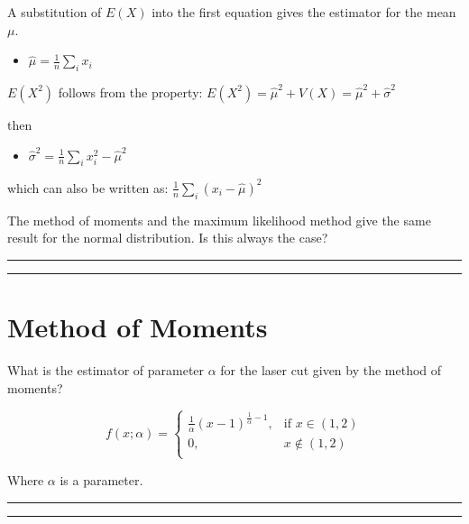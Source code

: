 \documentclass[
]{book}
\providecommand{\tightlist}{%
  \setlength{\itemsep}{0pt}\setlength{\parskip}{0pt}}
\begin{document}
A substitution of \(E(X)\) into the first equation gives the estimator for the mean \(\mu\).

\begin{itemize}
\tightlist
\item
  \(\hat{\mu}=\frac{1}{n}\sum_i x_i\)
\end{itemize}

\(E(X^2)\) follows from the property: \(E(X^2) = \hat{\mu}^2 + V(X)= \hat{\mu}^2+\hat{\sigma}^2\)

then

\begin{itemize}
\tightlist
\item
  \(\hat{\sigma}^2= \frac{1}{n} \sum_i x^2_i -\hat{\mu}^2\)
\end{itemize}

which can also be written as:
\(\frac{1}{n} \sum_i(x_i-\hat{\mu})^2\)

The method of moments and the maximum likelihood method give the same result for the normal distribution. Is this always the case?

\begin{center}\rule{0.5\linewidth}{0.5pt}\end{center}

\begin{center}\rule{0.5\linewidth}{0.5pt}\end{center}

\hypertarget{method-of-moments-7}{%
\section{Method of Moments}\label{method-of-moments-7}}

What is the estimator of parameter \(\alpha\) for the laser cut given by the method of moments?

\[
    f(x; \alpha)= 
\begin{cases}
\frac{1}{\alpha}(x-1)^{\frac{1}{\alpha}-1},& \text{if } x \in (1,2)\\
    0,& x \notin (1,2)\\
\end{cases}
\]

Where \(\alpha\) is a parameter.

\begin{center}\rule{0.5\linewidth}{0.5pt}\end{center}

\begin{center}\rule{0.5\linewidth}{0.5pt}\end{center}
\end{document}
